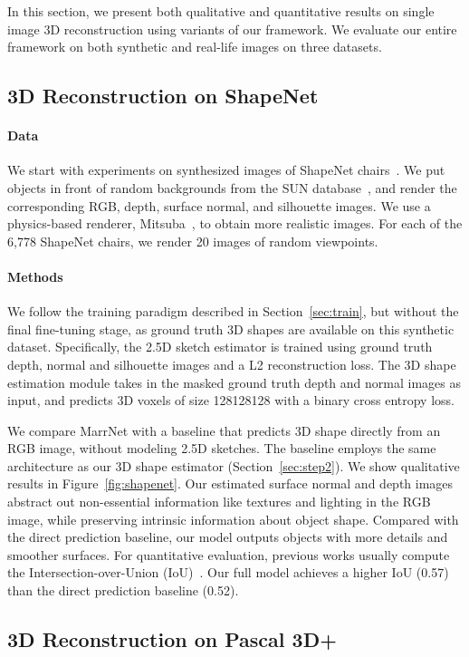 \documentclass{article}
\newcommand{\sect}[1]{Section~\ref{#1}}
\newcommand{\fig}[1]{Figure~\ref{#1}}
\newcommand{\myparagraph}[1]{\vspace{-3pt}\paragraph{#1}}
\begin{document}
In this section, we present both qualitative and quantitative results on single image 3D reconstruction using variants of our framework. We evaluate our entire framework on both synthetic and real-life images on three datasets. 

\subsection{3D Reconstruction on ShapeNet}
\label{sec:shapenet}

\paragraph{Data} 
We start with experiments on synthesized images of ShapeNet chairs~\citep{Chang2015}. We put objects in front of random backgrounds from the SUN database~\citep{Xiao2010}, and render the corresponding RGB, depth, surface normal, and silhouette images. We use a physics-based renderer, Mitsuba~\citep{Mitsuba}, to obtain more realistic images. For each of the 6,778 ShapeNet chairs, we render 20 images of random viewpoints.

\myparagraph{Methods}
We follow the training paradigm described in \sect{sec:train}, but without the final fine-tuning stage, as ground truth 3D shapes are available on this synthetic dataset. Specifically, the 2.5D sketch estimator is trained using ground truth depth, normal and silhouette images and a L2 reconstruction loss. The 3D shape estimation module takes in the masked ground truth depth and normal images as input, and predicts 3D voxels of size 128128128 with a binary cross entropy loss. 

We compare MarrNet with a baseline that predicts 3D shape directly from an RGB image, without modeling 2.5D sketches. The baseline employs the same architecture as our 3D shape estimator (\sect{sec:step2}). We show qualitative results in \fig{fig:shapenet}. Our estimated surface normal and depth images abstract out non-essential information like textures and lighting in the RGB image, while preserving intrinsic information about object shape. Compared with the direct prediction baseline, our model outputs objects with more details and smoother surfaces. For quantitative evaluation, previous works usually compute the Intersection-over-Union (IoU)~\citep{tulsiani2017multi,Choy2016}. Our full model achieves a higher IoU (0.57) than the direct prediction baseline (0.52).

\subsection{3D Reconstruction on Pascal 3D+}
\label{sec:pascal}
\end{document}
